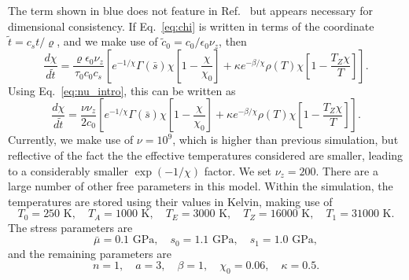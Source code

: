 \documentclass[12pt]{article}
\newcommand{\GPa}{\textrm{~GPa}}
\newcommand{\bs}{\bar{s}}
\newcommand{\mub}{\bar{\mu}}
\newcommand{\TK}{\textrm{~K}}
\begin{document}
The term shown in blue does not feature in Ref.~\cite{langer08} but appears
necessary for dimensional consistency. If Eq.~\ref{eq:chi} is written in terms
of the coordinate $\tilde{t}=c_s t / \varrho$, and we make use of
$\tilde{c}_0=c_0/\epsilon_0\nu_z$, then
\[
\frac{d\chi}{d\tilde{t}} = \frac{\varrho \epsilon_0 \nu_z}{\tau_0 c_0 c_s}
\left[e^{-1/\chi} \Gamma(\bs) \chi \left[ 1 - \frac{\chi}{\chi_0} \right] +
\kappa e^{-\beta/\chi} \rho(T) \chi \left[ 1 - \frac{T_Z\chi}{T}\right]\right].
\]
Using Eq.~\ref{eq:nu_intro}, this can be written as
\[
\frac{d\chi}{d\tilde{t}} = \frac{\nu\nu_z}{2 c_0}
\left[e^{-1/\chi} \Gamma(\bs) \chi \left[ 1 - \frac{\chi}{\chi_0} \right] +
\kappa e^{-\beta/\chi} \rho(T) \chi \left[ 1 - \frac{T_Z\chi}{T}\right]\right].
\]
Currently, we make use of $\nu=10^9$, which is higher than previous simulation,
but reflective of the fact the the effective temperatures considered are
smaller, leading to a considerably smaller $\exp(-1/\chi)$ factor. We set
$\nu_z=200$. There are a large number of other free parameters in this model.
Within the simulation, the temperatures are stored using their values in
Kelvin, making use of
\[
T_0 = 250 \TK, \quad T_A = 1000 \TK, \quad T_E = 3000\TK, \quad T_Z= 16000\TK, \quad T_1 = 31000\TK.
\]
The stress parameters are
\[
\mub=0.1\GPa, \quad s_0= 1.1\GPa, \quad s_1=1.0\GPa,
\]
and the remaining parameters are
\[
n=1, \quad a=3, \quad \beta =1, \quad \chi_0=0.06, \quad \kappa=0.5.
\]
\end{document}
